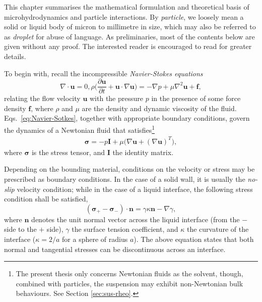 This chapter summarises the mathematical formulation and theoretical basis of microhydrodynamics and particle interactions.
By \emph{particle}, we loosely mean a solid or liquid body of micron to millimetre in size, which may also be referred to as \emph{droplet} for abuse of language.
As preliminaries, most of the contents below are given without any proof. The interested reader is encouraged to read \cite{Batchelor, hb, ps, kim_karrila, graham_2018} for greater details.

\bigskip

To begin with, recall the incompressible \emph{Navier-Stokes equations}
\begin{subequations} \label{eq:Navier-Sotkes}
 \begin{equation}
   \nabla \cdot {\bm u} = 0,
  \label{eq:div-free}
 \end{equation}
 \begin{equation}
   \rho \bigg(\frac{\partial {\bm u}}{\partial t} + {\bm u} \cdot \nabla {\bm u} \bigg) = -\nabla p + \mu \nabla ^2  {\bm u} + {\bm f},
  \label{eq:NS}
 \end{equation}
\end{subequations}
relating the flow velocity $\bm u$ with the pressure $p$ in the presence of some force density $\bm f$, where $\rho$ and $\mu$ are the density and dynamic viscosity of the fluid.
Eqs.\ \eqref{eq:Navier-Sotkes}, together with appropriate boundary conditions, govern the dynamics of a Newtonian fluid that satisfies\footnote{The present thesis only concerns Newtonian fluids as the solvent, though, combined with particles, the suspension may exhibit non-Newtonian bulk behaviours. See Section \ref{sec:sus-rheo}.}
\begin{equation}
 \begin{aligned}
   {\bm \sigma} = -p {\bm I}+ \mu \bigg( \nabla {\bm u} + (\nabla {\bm u})^T \bigg),
 \end{aligned}
\end{equation}
where $\bm \sigma$ is the stress tensor, and $\bm I$ the identity matrix.

Depending on the bounding material, conditions on the velocity or stress may be prescribed as boundary conditions. In the case of a solid wall, it is usually the \emph{no-slip} velocity condition; while in the case of a liquid interface, the following stress condition shall be satisfied,
\begin{equation} \label{eq:stress-bc}
  ({\bm \sigma}_+ - {\bm \sigma}_- ) \cdot {\bm n} = \gamma \kappa {\bm n} - \nabla \gamma,
\end{equation}
where $\bm n$ denotes the unit normal vector across the liquid interface (from the $-$ side to the $+$ side), $\gamma$ the surface tension coefficient, and $\kappa$ the curvature of the interface (\eg $\kappa=2/a$ for a sphere of radius $a$).
The above equation states that both normal and tangential stresses can be discontinuous across an interface.


